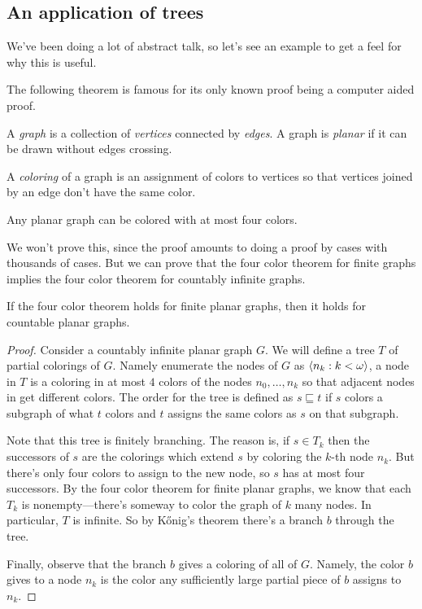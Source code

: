 \documentclass[10pt]{amsart}
\begin{document}
\subsection{An application of trees}

We've been doing a lot of abstract talk, so let's see an example to get a feel for why this is useful. 

The following theorem is famous for its only known proof being a computer aided proof.

\begin{definition}
A \emph{graph} is a collection of \emph{vertices} connected by \emph{edges}. A graph is \emph{planar} if it can be drawn without edges crossing.
\end{definition}

\begin{definition}
A \emph{coloring} of a graph is an assignment of colors to vertices so that vertices joined by an edge don't have the same color.
\end{definition}

\begin{theorem}
Any planar graph can be colored with at most four colors.
\end{theorem}

We won't prove this, since the proof amounts to doing a proof by cases with thousands of cases. But we can prove that the four color theorem for finite graphs implies the four color theorem for countably infinite graphs.

\begin{theorem}
If the four color theorem holds for finite planar graphs, then it holds for countable planar graphs.
\end{theorem}

\begin{proof}
Consider a countably infinite planar graph $G$. We will define a tree $T$ of partial colorings of $G$. Namely enumerate the nodes of $G$ as ${\left\langle n_k : k < \omega \right\rangle}$, a node in $T$ is a coloring in at most $4$ colors of the nodes $n_0, \ldots, n_k$ so that adjacent nodes in get different colors. The order for the tree is defined as $s \sqsubseteq t$ if $s$ colors a subgraph of what $t$ colors and $t$ assigns the same colors as $s$ on that subgraph.

Note that this tree is finitely branching. The reason is, if $s \in T_k$ then the successors of $s$ are the colorings which extend $s$ by coloring the $k$-th node $n_k$. But there's only four colors to assign to the new node, so $s$ has at most four successors. By the four color theorem for finite planar graphs, we know that each $T_k$ is nonempty---there's someway to color the graph of $k$ many nodes. In particular, $T$ is infinite. So by K\H{o}nig's theorem there's a branch $b$ through the tree.

Finally, observe that the branch $b$ gives a coloring of all of $G$. Namely, the color $b$ gives to a node $n_k$ is the color any sufficiently large partial piece of $b$ assigns to $n_k$.
\end{proof}
\end{document}
